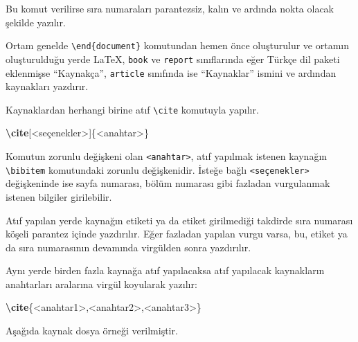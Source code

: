 \documentclass[
  10pt,
]{scrbook}
\newenvironment{Shaded}{}{}
\newcommand{\ExtensionTok}[1]{#1}
\newcommand{\KeywordTok}[1]{\textcolor[rgb]{0.00,0.44,0.13}{\textbf{#1}}}
\newcommand{\NormalTok}[1]{#1}
\theoremstyle{definition}
\theoremstyle{definition}
\theoremstyle{definition}
\theoremstyle{definition}
\theoremstyle{remark}
\begin{document}
Bu komut verilirse sıra numaraları parantezsiz, kalın ve ardında nokta olacak şekilde yazılır.

Ortam genelde \texttt{\textbackslash{}end\{document\}} komutundan hemen önce oluşturulur ve ortamın oluşturulduğu yerde LaTeX, \texttt{book} ve \texttt{report} sınıflarında eğer Türkçe dil paketi eklenmişse ``Kaynakça'', \texttt{article} sınıfında ise ``Kaynaklar'' ismini ve ardından kaynakları yazdırır.

Kaynaklardan herhangi birine atıf \texttt{\textbackslash{}cite} komutuyla yapılır.

\begin{Shaded}
\begin{Highlighting}[]
\KeywordTok{\textbackslash{}cite}\NormalTok{[\textless{}seçenekler\textgreater{}]\{}\ExtensionTok{\textless{}anahtar\textgreater{}}\NormalTok{\}}
\end{Highlighting}
\end{Shaded}

Komutun zorunlu değişkeni olan \texttt{\textless{}anahtar\textgreater{}}, atıf yapılmak istenen kaynağın \texttt{\textbackslash{}bibitem} komutundaki zorunlu değişkenidir. İsteğe bağlı \texttt{\textless{}seçenekler\textgreater{}} değişkeninde ise sayfa numarası, bölüm numarası gibi fazladan vurgulanmak istenen bilgiler girilebilir.

Atıf yapılan yerde kaynağın etiketi ya da etiket girilmediği takdirde sıra numarası köşeli parantez içinde yazdırılır. Eğer fazladan yapılan vurgu varsa, bu, etiket ya da sıra numarasının devamında virgülden sonra yazdırılır.

Aynı yerde birden fazla kaynağa atıf yapılacaksa atıf yapılacak kaynakların anahtarları aralarına virgül koyularak yazılır:

\begin{Shaded}
\begin{Highlighting}[]
\KeywordTok{\textbackslash{}cite}\NormalTok{\{}\ExtensionTok{\textless{}anahtar1\textgreater{},\textless{}anahtar2\textgreater{},\textless{}anahtar3\textgreater{}}\NormalTok{\}}
\end{Highlighting}
\end{Shaded}

Aşağıda kaynak dosya örneği verilmiştir.
\end{document}
